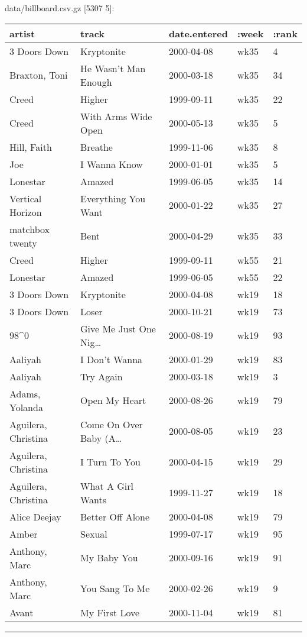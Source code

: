 \documentclass[]{article}
\newenvironment{Shaded}{\begin{snugshade}}{\end{snugshade}}
\newcommand{\AttributeTok}[1]{\textcolor[rgb]{0.77,0.63,0.00}{#1}}
\newcommand{\NormalTok}[1]{#1}
\newcommand{\StringTok}[1]{\textcolor[rgb]{0.31,0.60,0.02}{#1}}
\newcommand{\VariableTok}[1]{\textcolor[rgb]{0.00,0.00,0.00}{#1}}
\begin{document}
\begin{Shaded}
\end{Shaded}

data/billboard.csv.gz {[}5307 5{]}:

\begin{longtable}[]{@{}lllll@{}}
\toprule
artist & track & date.entered & :week & :rank\tabularnewline
\midrule
\endhead
3 Doors Down & Kryptonite & 2000-04-08 & wk35 & 4\tabularnewline
Braxton, Toni & He Wasn't Man Enough & 2000-03-18 & wk35 &
34\tabularnewline
Creed & Higher & 1999-09-11 & wk35 & 22\tabularnewline
Creed & With Arms Wide Open & 2000-05-13 & wk35 & 5\tabularnewline
Hill, Faith & Breathe & 1999-11-06 & wk35 & 8\tabularnewline
Joe & I Wanna Know & 2000-01-01 & wk35 & 5\tabularnewline
Lonestar & Amazed & 1999-06-05 & wk35 & 14\tabularnewline
Vertical Horizon & Everything You Want & 2000-01-22 & wk35 &
27\tabularnewline
matchbox twenty & Bent & 2000-04-29 & wk35 & 33\tabularnewline
Creed & Higher & 1999-09-11 & wk55 & 21\tabularnewline
Lonestar & Amazed & 1999-06-05 & wk55 & 22\tabularnewline
3 Doors Down & Kryptonite & 2000-04-08 & wk19 & 18\tabularnewline
3 Doors Down & Loser & 2000-10-21 & wk19 & 73\tabularnewline
98\^{}0 & Give Me Just One Nig\ldots{} & 2000-08-19 & wk19 &
93\tabularnewline
Aaliyah & I Don't Wanna & 2000-01-29 & wk19 & 83\tabularnewline
Aaliyah & Try Again & 2000-03-18 & wk19 & 3\tabularnewline
Adams, Yolanda & Open My Heart & 2000-08-26 & wk19 & 79\tabularnewline
Aguilera, Christina & Come On Over Baby (A\ldots{} & 2000-08-05 & wk19 &
23\tabularnewline
Aguilera, Christina & I Turn To You & 2000-04-15 & wk19 &
29\tabularnewline
Aguilera, Christina & What A Girl Wants & 1999-11-27 & wk19 &
18\tabularnewline
Alice Deejay & Better Off Alone & 2000-04-08 & wk19 & 79\tabularnewline
Amber & Sexual & 1999-07-17 & wk19 & 95\tabularnewline
Anthony, Marc & My Baby You & 2000-09-16 & wk19 & 91\tabularnewline
Anthony, Marc & You Sang To Me & 2000-02-26 & wk19 & 9\tabularnewline
Avant & My First Love & 2000-11-04 & wk19 & 81\tabularnewline
\bottomrule
\end{longtable}

\begin{center}\rule{0.5\linewidth}{0.5pt}\end{center}
\end{document}
